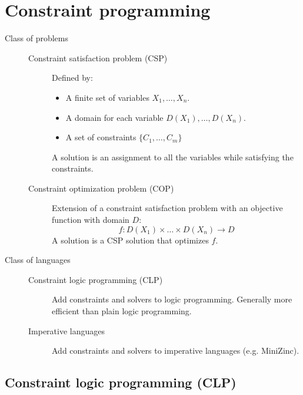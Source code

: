 \chapter{Constraint programming}

\begin{description}
    \item[Class of problems] \phantom{}
        \begin{description}
            \item[Constraint satisfaction problem (CSP)] 
                Defined by:
                \begin{itemize}
                    \item A finite set of variables ${X_1, \dots, X_n}$.
                    \item A domain for each variable $D(X_1), \dots, D(X_n)$.
                    \item A set of constraints $\{ C_1, \dots, C_m \}$
                \end{itemize}
                A solution is an assignment to all the variables while satisfying the constraints.

            \item[Constraint optimization problem (COP)] 
                Extension of a constraint satisfaction problem with an objective function with domain $D$:
                \[ f: D(X_1) \times \dots \times D(X_n) \rightarrow D \]
                A solution is a CSP solution that optimizes $f$.
        \end{description}

    \item[Class of languages] \phantom{}
        \begin{description}
            \item[Constraint logic programming (CLP)] 
                Add constraints and solvers to logic programming.
                Generally more efficient than plain logic programming.

            \item[Imperative languages] 
                Add constraints and solvers to imperative languages (e.g. MiniZinc).
        \end{description}
\end{description}



\section{Constraint logic programming (CLP)}


